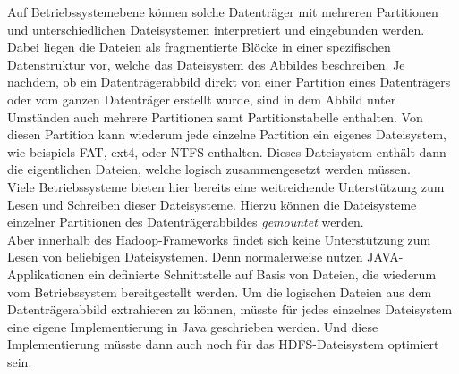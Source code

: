 \noindent
Auf Betriebssystemebene können solche Datenträger mit mehreren Partitionen und unterschiedlichen Dateisystemen interpretiert und eingebunden werden. Dabei liegen die Dateien als fragmentierte Blöcke in einer spezifischen Datenstruktur vor, welche das Dateisystem des Abbildes beschreiben. Je nachdem, ob ein Datenträgerabbild direkt von einer Partition eines Datenträgers oder vom ganzen Datenträger erstellt wurde, sind in dem Abbild unter Umständen auch mehrere Partitionen samt Partitionstabelle enthalten. Von diesen Partition kann wiederum jede einzelne Partition ein eigenes Dateisystem, wie beispiels FAT, ext4, oder NTFS enthalten. Dieses Dateisystem enthält dann die eigentlichen Dateien, welche logisch zusammengesetzt werden müssen.\\ 
Viele Betriebssysteme bieten hier bereits eine weitreichende Unterstützung zum Lesen und Schreiben dieser Dateisysteme. Hierzu können die Dateisysteme einzelner Partitionen des Datenträgerabbildes \textit{gemountet} werden.\\

\noindent
Aber innerhalb des Hadoop-Frameworks findet sich keine Unterstützung zum Lesen von beliebigen Dateisystemen. Denn normalerweise nutzen JAVA-Applikationen ein definierte Schnittstelle auf Basis von Dateien, die wiederum vom Betriebssystem bereitgestellt werden. Um die logischen Dateien aus dem Datenträgerabbild extrahieren zu können, müsste für jedes einzelnes Dateisystem eine eigene Implementierung in Java geschrieben werden. Und diese Implementierung müsste dann auch noch für das HDFS-Dateisystem optimiert sein.\\ 

